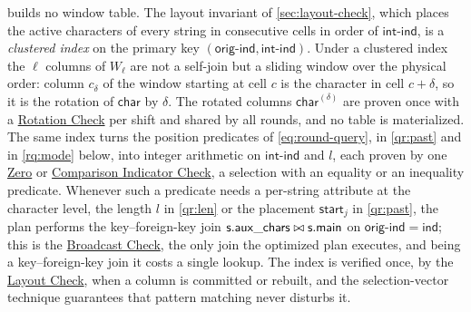   builds no window table. The layout invariant of \cref{sec:layout-check}, which places the active characters of every string in consecutive cells in order of $\mathsf{int\text{-}ind}$, is a \emph{clustered index} on the primary key $(\mathsf{orig\text{-}ind},\mathsf{int\text{-}ind})$. Under a clustered index the $\ell$ columns of $W_\ell$ are not a self-join but a sliding window over the physical order: column $c_\delta$ of the window starting at cell $c$ is the character in cell $c+\delta$, so it is the rotation of $\mathsf{char}$ by $\delta$. The rotated columns $\mathsf{char}^{(\delta)}$ are proven once with a \hyperref[{piop:rotcheck}]{Rotation Check} per shift and shared by all rounds, and no table is materialized. The same index turns the position predicates of \cref{eq:round-query}, in \cref{qr:past} and in \cref{rq:mode} below, into integer arithmetic on $\mathsf{int\text{-}ind}$ and $l$, each proven by one \hyperref[{piop:zero-indicator}]{Zero} or \hyperref[{piop:cmp-indicator}]{Comparison Indicator Check}, a selection with an equality or an inequality predicate. Whenever such a predicate needs a per-string attribute at the character level, the length $l$ in \cref{qr:len} or the placement $\mathsf{start}_j$ in \cref{qr:past}, the plan performs the key--foreign-key join $\mathsf{s}.\mathsf{aux\_chars}\bowtie\mathsf{s}.\mathsf{main}$ on $\mathsf{orig\text{-}ind}=\mathsf{ind}$; this is the \hyperref[{piop:broadcast}]{Broadcast Check}, the only join the optimized plan executes, and being a key--foreign-key join it costs a single lookup. The index is verified once, by the \hyperref[{piop:layout-check}]{Layout Check}, when a column is committed or rebuilt, and the selection-vector technique guarantees that pattern matching never disturbs it.

